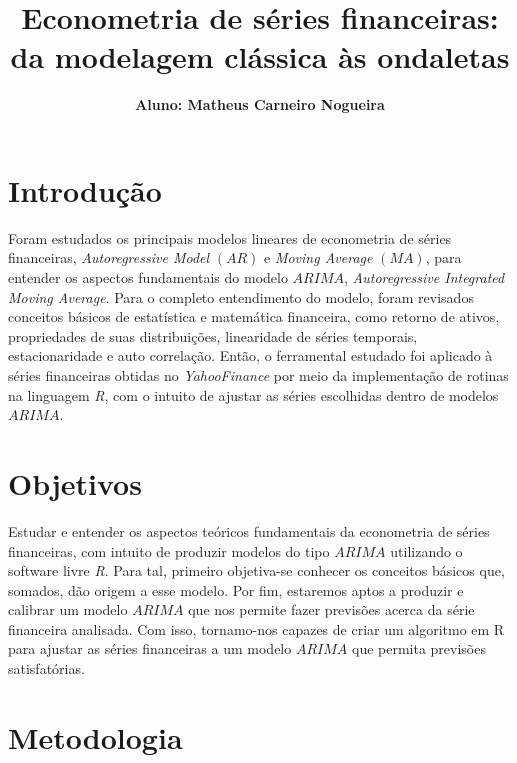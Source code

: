 \documentclass[12pt]{article}
\title{\textbf{Econometria de séries financeiras: da modelagem clássica às ondaletas}}
\author{\textbf{Aluno: Matheus Carneiro Nogueira}}
\date{}
\begin{document}
\maketitle

\section{Introdução}\label{sec_intro}
Foram estudados os principais modelos lineares de econometria de séries financeiras,
\textit{Autoregressive Model} $ (AR) $ e \textit{Moving Average} $ (MA) $, para entender os aspectos
fundamentais do modelo $ ARIMA $, \textit{Autoregressive Integrated Moving Average}. Para o
completo entendimento do modelo, foram revisados conceitos básicos de estatística e
matemática financeira, como retorno de ativos, propriedades de suas distribuições, linearidade
de séries temporais, estacionaridade e auto correlação. Então, o ferramental estudado foi aplicado à séries financeiras obtidas no \textit{YahooFinance} por meio da implementação de rotinas na linguagem \emph{R}, com o intuito de ajustar as séries escolhidas dentro de modelos $ ARIMA $. 

\section{Objetivos}\label{sec_obje}
Estudar e entender os aspectos teóricos fundamentais da econometria de séries
financeiras, com intuito de produzir modelos do tipo $ ARIMA $ utilizando o software livre \emph{R}. Para tal, primeiro objetiva-se conhecer os conceitos básicos que, somados, dão origem a esse modelo. Por fim, estaremos
aptos a produzir e calibrar um modelo $ ARIMA $ que nos permite fazer previsões acerca da
série financeira analisada. Com isso, tornamo-nos capazes de criar um algoritmo em R para ajustar as séries financeiras a um modelo $ ARIMA $ que permita previsões satisfatórias. 


\section{Metodologia}
\end{document}
